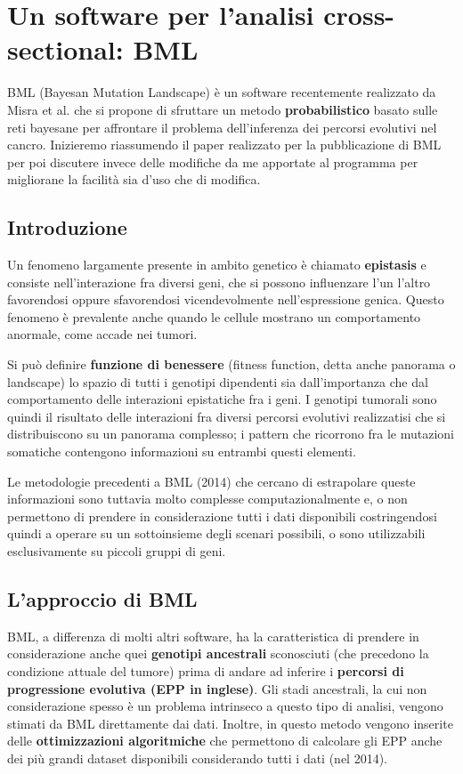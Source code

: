 \documentclass[a4paper]{article}
\begin{document}
	\section{\LARGE Un software per l'analisi cross-sectional: BML}

	BML (Bayesan Mutation Landscape) è un software recentemente realizzato da Misra et al. \cite{BMLPub} che si propone di sfruttare
	un metodo \textbf{probabilistico} basato sulle reti bayesane per affrontare il problema dell'inferenza dei percorsi evolutivi
	nel cancro. Inizieremo riassumendo il paper realizzato per la pubblicazione di BML per poi discutere invece delle modifiche da 
	me apportate al programma per migliorane la facilità sia d'uso che di modifica.

	\subsection{\large Introduzione}

	Un fenomeno largamente presente in ambito genetico è chiamato \textbf{epistasis} e consiste nell'interazione fra diversi geni,
	che si possono influenzare l'un l'altro favorendosi oppure sfavorendosi vicendevolmente nell'espressione genica. Questo 
	fenomeno è prevalente anche quando le cellule mostrano un comportamento anormale, come accade nei tumori.

	Si può definire \textbf{funzione di benessere} (fitness function, detta anche panorama o landscape) lo spazio di tutti i
	genotipi dipendenti sia dall'importanza che dal comportamento delle interazioni epistatiche fra i geni. I
	genotipi tumorali sono quindi il risultato delle interazioni fra diversi percorsi evolutivi realizzatisi che si distribuiscono
	su un panorama complesso; i pattern che ricorrono fra le mutazioni somatiche contengono informazioni
	su entrambi questi elementi.
	 
	Le metodologie precedenti a BML (2014) che cercano di estrapolare queste informazioni sono tuttavia molto
	complesse computazionalmente e, o non permettono di prendere in considerazione tutti i dati disponibili costringendosi quindi
	a operare su un sottoinsieme degli scenari possibili, o sono utilizzabili esclusivamente su
	piccoli gruppi di geni.

	\subsection{\large L'approccio di BML}

	BML, a differenza di molti altri software, ha la caratteristica di prendere in
	considerazione anche quei \textbf{genotipi ancestrali} sconosciuti (che precedono la condizione attuale del tumore)
	prima di andare ad inferire i \textbf{percorsi di progressione evolutiva (EPP in inglese)}. Gli stadi ancestrali, la cui
	non considerazione spesso è un problema intrinseco a questo tipo di analisi, vengono stimati da BML
	direttamente dai dati. Inoltre, in questo metodo vengono inserite delle \textbf{ottimizzazioni algoritmiche} che
	permettono di calcolare gli EPP anche dei più grandi dataset disponibili considerando tutti i dati (nel 2014).
	
\end{document}
